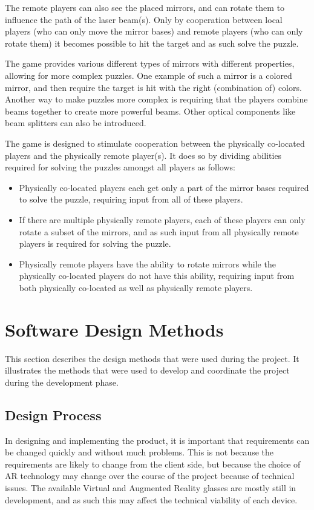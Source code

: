     The remote players can also see the placed mirrors, and can rotate them
    to influence the path of the laser beam(s). Only by cooperation between
    local players (who can only move the mirror bases) and remote players
    (who can only rotate them) it becomes possible to hit the target and as
    such solve the puzzle.

    The game provides various different types of mirrors with different
    properties, allowing for more complex puzzles. One example of such a
    mirror is a colored mirror, and then require the target is hit with the
    right (combination of) colors. Another way to make puzzles more complex
    is requiring that the players combine beams together to create more
    powerful beams. Other optical components like beam splitters can also be
    introduced.

    The game is designed to stimulate cooperation between the physically
    co-located players and the physically remote player(s). It does so by
    dividing abilities required for solving the puzzles amongst all players
    as follows:

    \begin{itemize}
      \item Physically co-located players each get only a part of the
            mirror bases required to solve the puzzle, requiring input
            from all of these players.
      \item If there are multiple physically remote players, each of
            these players can only rotate a subset of the mirrors, and
            as such input from all physically remote players is
            required for solving the puzzle.
      \item Physically remote players have the ability to rotate
            mirrors while the physically co-located players do not have
            this ability, requiring input from both physically co-located
            as well as physically remote players.
    \end{itemize}

  \section{Software Design Methods} \label{sec:designmethods}
    This section describes the design methods that were used during the
    project. It illustrates the methods that were used to develop and
    coordinate the project during the development phase.

    \subsection{Design Process} \label{ssec:designprocess}
      In designing and implementing the product, it is important that
      requirements can be changed quickly and without much problems. This is
      not because the requirements are likely to change from the client
      side, but because the choice of AR technology may change over the
      course of the project because of technical issues. The available Virtual
      and Augmented Reality glasses are mostly still in development, and as
      such this may affect the technical viability of each device.

